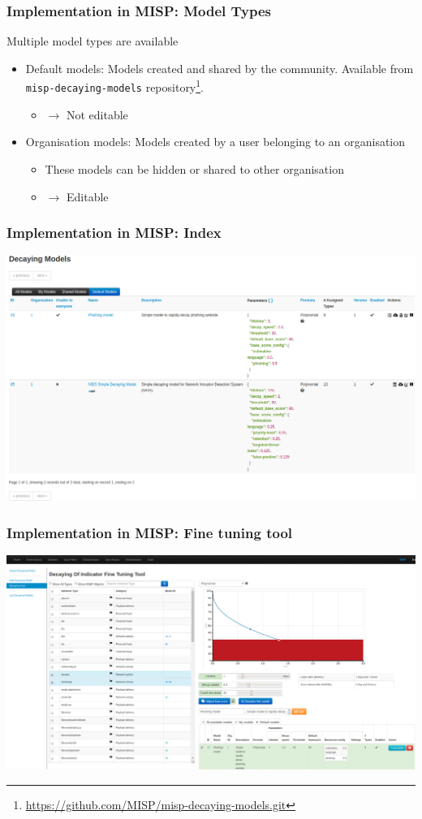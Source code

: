 \begin{frame}
    \frametitle{Implementation in MISP: Model Types}
    Multiple model types are available
    \begin{itemize}
        \item Default models: Models created and shared by the community. Available from \texttt{misp-decaying-models} repository\footnote{\url{https://github.com/MISP/misp-decaying-models.git}}.
        \begin{itemize}
            \item $\rightarrow$ Not editable
        \end{itemize}
        \item Organisation models: Models created by a user belonging to an organisation
        \begin{itemize}
            \item These models can be hidden or shared to other organisation 
            \item $\rightarrow$ Editable
        \end{itemize}
    \end{itemize}
\end{frame}

\begin{frame}
    \frametitle{Implementation in MISP: Index}
    \includegraphics[width=1.00\linewidth]{pics/decaying-index.png}
\end{frame}

\begin{frame}
    \frametitle{Implementation in MISP: Fine tuning tool}
    \includegraphics[width=1.00\linewidth]{pics/decaying-tool.png}
\end{frame}

